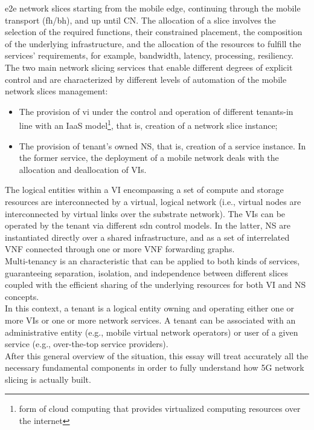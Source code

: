 \documentclass{report}
\begin{document}
\gls{e2e} network slices starting from the mobile edge, continuing
through the mobile transport (\gls{fh}/\gls{bh}), and up until
\gls{CN}. The allocation of a slice involves the selection of the
required functions, their constrained placement, the composition of the underlying infrastructure, and the allocation of the resources to fulfill the services' requirements, for example, bandwidth, latency, processing, resiliency.\\
The two main network slicing services that enable different degrees
of explicit control and are characterized by different levels of automation of the
mobile network slices management:
\begin{itemize}
\item The provision of \gls{vi} under the control and operation
of different tenants-in line with an \gls{IaaS} model\footnote{form of cloud computing that provides virtualized computing resources over the internet},
that is, creation of a network slice instance;
\end{itemize}
\begin{itemize}
\item The provision of tenant's owned \gls{NS}, that is, creation of a service instance.
In the former service, the deployment of a mobile network deals with the
allocation and deallocation of VIs.
\end{itemize}
The logical entities within a VI encompassing
a set of compute and storage resources are interconnected by a virtual, logical
network (i.e., virtual nodes are interconnected by virtual links over the substrate
network). The VIs can be operated by the tenant via different \gls{sdn} control
models. In the latter, NS are instantiated directly over a shared infrastructure,
and as a set of interrelated \gls{VNF} connected through
one or more VNF forwarding graphs.\\
Multi-tenancy is an characteristic that can be applied to both
kinds of services, guaranteeing separation, isolation, and independence between
different slices coupled with the efficient sharing of the underlying resources
for both VI and NS concepts.\\
In this context, a tenant is a logical entity owning and operating either one or more VIs or one or more network services. A tenant can be associated with an administrative entity (e.g., mobile virtual network operators) or
user of a given service (e.g., over-the-top service providers).\\
After this general overview of the situation, this essay will treat accurately all the necessary fundamental components in order to fully understand how 5G network slicing is actually built.
\end{document}
